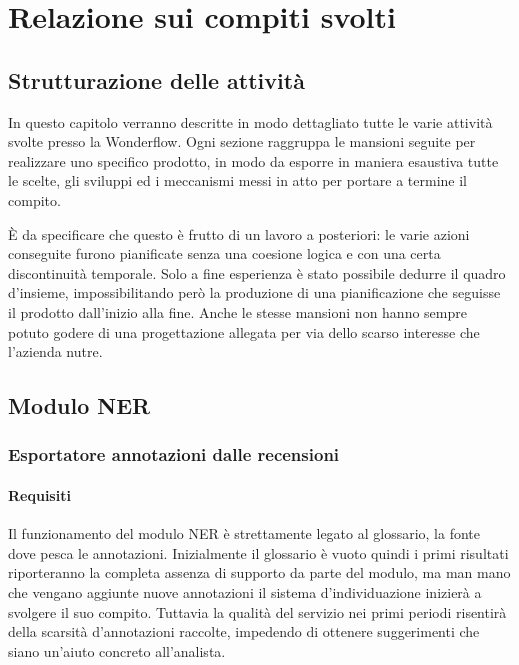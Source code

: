 
\chapter{Relazione sui compiti svolti}
\label{cap:relazione}

\section{Strutturazione delle attività}
In questo capitolo verranno descritte in modo dettagliato tutte le varie
attività svolte presso la Wonderflow. Ogni sezione raggruppa le mansioni seguite
per realizzare uno specifico prodotto, in modo da esporre in maniera esaustiva
tutte le scelte, gli sviluppi ed i meccanismi messi in atto per portare a
termine il compito.

È da specificare che questo è frutto di un lavoro a posteriori: le varie azioni
conseguite furono pianificate senza una coesione logica e con una certa
discontinuità temporale. Solo a fine esperienza è stato possibile dedurre il
quadro d'insieme, impossibilitando però la produzione di una pianificazione che
seguisse il prodotto dall'inizio alla fine. Anche le stesse mansioni non hanno
sempre potuto godere di una progettazione allegata per via dello scarso
interesse che l'azienda nutre.

\section{Modulo NER}
\label{sec:ner}
\subsection{Esportatore annotazioni dalle recensioni}
\subsubsection{Requisiti}
Il funzionamento del modulo NER è strettamente legato al glossario, la fonte 
dove pesca le annotazioni. Inizialmente il glossario è vuoto quindi i primi 
risultati riporteranno la completa assenza di supporto da parte del modulo, ma 
man mano che vengano aggiunte nuove annotazioni il sistema d'individuazione 
inizierà a svolgere il suo compito. Tuttavia la qualità del servizio nei primi 
periodi risentirà della scarsità d'annotazioni raccolte, impedendo di ottenere
suggerimenti che siano un'aiuto concreto all'analista.

